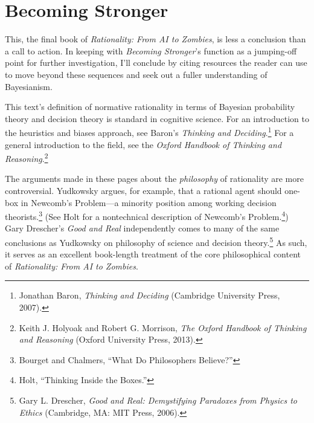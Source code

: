 \part{Becoming Stronger}



{
 This, the final book of \textit{Rationality: From AI to Zombies},
is less a conclusion than a call to action. In keeping with
\textit{Becoming Stronger}'s function as a jumping-off
point for further investigation, I'll conclude by
citing resources the reader can use to move beyond these sequences and
seek out a fuller understanding of Bayesianism.}

{
 This text's definition of normative rationality in
terms of Bayesian probability theory and decision theory is standard in
cognitive science. For an introduction to the heuristics and biases
approach, see Baron's \textit{Thinking and
Deciding}.\footnote{Jonathan Baron, \textit{Thinking and Deciding} (Cambridge
University Press, 2007).} For a general introduction to the field,
see the \textit{Oxford Handbook of Thinking and
Reasoning}.\footnote{Keith J. Holyoak and Robert G. Morrison, \textit{The Oxford
Handbook of Thinking and Reasoning} (Oxford University Press, 2013).}}

{
 The arguments made in these pages about the \textit{philosophy} of
rationality are more controversial. Yudkowsky argues, for example, that
a rational agent should one-box in Newcomb's
Problem---a minority position among working decision
theorists.\footnote{Bourget and Chalmers, ``What Do Philosophers
Believe?''} (See Holt for a nontechnical description
of Newcomb's Problem.\footnote{Holt, ``Thinking Inside the
Boxes.''}) Gary
Drescher's \textit{Good and Real} independently comes
to many of the same conclusions as Yudkowsky on philosophy of science
and decision theory.\footnote{Gary L. Drescher, \textit{Good and Real: Demystifying Paradoxes
from Physics to Ethics} (Cambridge, MA: MIT Press, 2006).} As such, it serves as an
excellent book-length treatment of the core philosophical content of
\textit{Rationality: From AI to Zombies}.}

